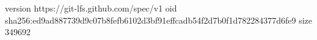 version https://git-lfs.github.com/spec/v1
oid sha256:ed9ad887739d9c07b8fefb6102d3bf91effcadb54f2d7b0f1d782284377d6fe9
size 349692

